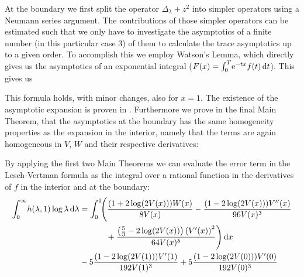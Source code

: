 At the boundary we first split the operator $\Delta_\lambda + z^2$ into simpler
operators using a Neumann series argument. The contributions of those simpler
operators can be estimated such that we only have to investigate the asymptotics
of a finite number (in this particular case 3) of them to calculate the trace
asymptotics up to a given order.
%
To accomplish this we employ Watson's Lemma, which directly gives us the
asymptotics of an exponential integral ($F(x) =
\Integ[T]{0}{t}{\Eto{-tx}f(t)}$). This gives us
\begin{MainTheoremIntro}
  
\end{MainTheoremIntro}
This formula holds, with minor changes, also for $x=1$. The existence of the
asymptotic expansion is proven in \cite{LV13}.
%
Furthermore we prove in the final Main Theorem, that the asymptotics at the
boundary has the same homogeneity properties as the expansion in the interior,
namely that the terms are again homogeneous in $V$, $W$ and their respective
derivatives:
\begin{MainTheoremIntro}
  
\end{MainTheoremIntro}

By applying the first two Main Theorems we can evaluate the error term in the
Lesch-Vertman formula as the integral over a rational function in the
derivatives of $f$ in the interior and at the boundary:
\begin{align*}
  \Integ[\infty]{0}{\lambda}{
    h(\lambda, 1) \log\lambda
  }
  &=
  \Int{x}{\Biggl(\frac{(1 + 2 \log(2 V(x))) W(x)}{8 V(x)}
    - \frac{ (1 - 2 \log(2 V(x)))V''(x)}{96 V(x)^{3}} \\
    &\hphantom{=\int_0^1\Biggl(}\mathbin{+} \frac{\left(\frac{5}{3} - 2\log(2
    V(x))\right)\left(V'(x)\right)^{2}}{64 V(x)^{5}}\Biggr) } \\
&\mathbin- 5\frac{(1 - 2\log(2 V(1)))V'(1)}{192 V(1)^3}
+ 5\frac{(1 - 2 \log(2 V(0)))V'(0)}{192 V(0)^3}
\end{align*}
